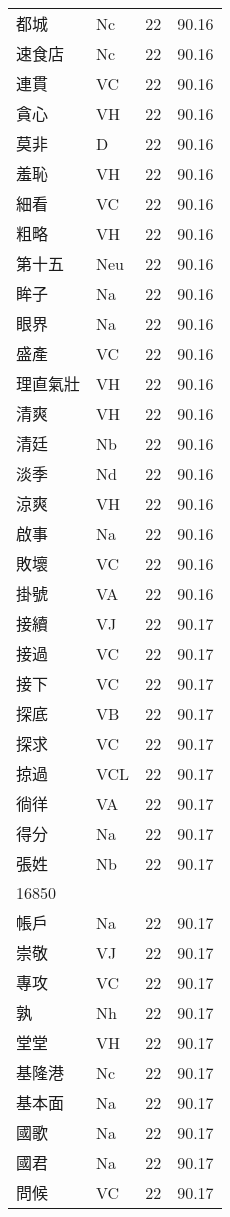 \documentclass[twocolumn]{book}
\begin{document}
\begin{supertabular}{llrr}
都城 & Nc & 22 &  90.16\\
速食店 & Nc & 22 &  90.16\\
連貫 & VC & 22 &  90.16\\
貪心 & VH & 22 &  90.16\\
莫非 & D & 22 &  90.16\\
羞恥 & VH & 22 &  90.16\\
細看 & VC & 22 &  90.16\\
粗略 & VH & 22 &  90.16\\
第十五 & Neu & 22 &  90.16\\
眸子 & Na & 22 &  90.16\\
眼界 & Na & 22 &  90.16\\
盛產 & VC & 22 &  90.16\\
理直氣壯 & VH & 22 &  90.16\\
清爽 & VH & 22 &  90.16\\
清廷 & Nb & 22 &  90.16\\
淡季 & Nd & 22 &  90.16\\
涼爽 & VH & 22 &  90.16\\
啟事 & Na & 22 &  90.16\\
敗壞 & VC & 22 &  90.16\\
掛號 & VA & 22 &  90.16\\
接續 & VJ & 22 &  90.17\\
接過 & VC & 22 &  90.17\\
接下 & VC & 22 &  90.17\\
探底 & VB & 22 &  90.17\\
探求 & VC & 22 &  90.17\\
掠過 & VCL & 22 &  90.17\\
徜徉 & VA & 22 &  90.17\\
得分 & Na & 22 &  90.17\\
張姓 & Nb & 22 &  90.17\\
16850\\
帳戶 & Na & 22 &  90.17\\
崇敬 & VJ & 22 &  90.17\\
專攻 & VC & 22 &  90.17\\
孰 & Nh & 22 &  90.17\\
堂堂 & VH & 22 &  90.17\\
基隆港 & Nc & 22 &  90.17\\
基本面 & Na & 22 &  90.17\\
國歌 & Na & 22 &  90.17\\
國君 & Na & 22 &  90.17\\
問候 & VC & 22 &  90.17\\

\end{supertabular}
\end{document}
